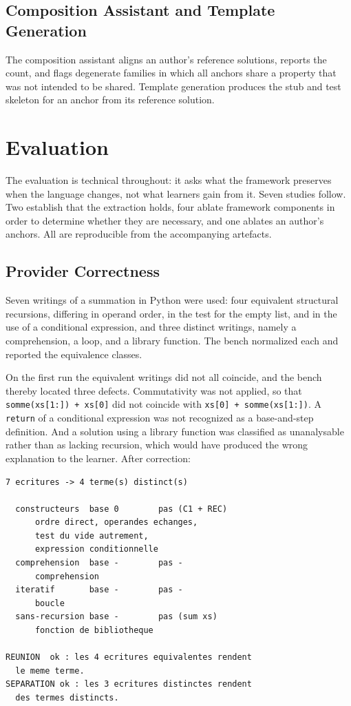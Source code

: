 \documentclass[journal]{IEEEtran}
\begin{document}
\subsection{Composition Assistant and Template Generation}\label{sec:7.3}
The composition assistant aligns an author's reference solutions,
reports the count, and flags degenerate families in which all anchors
share a property that was not intended to be shared. Template generation
produces the stub and test skeleton for an anchor from its reference
solution.

\section{Evaluation}\label{sec:8}
The evaluation is technical throughout: it asks what the framework
preserves when the language changes, not what learners gain from it.
Seven studies follow. Two establish that the extraction holds, four ablate
framework components in order to determine whether they are necessary, and
one ablates an author's anchors.
All are reproducible from the accompanying artefacts.

\subsection{Provider Correctness}\label{sec:8.1}
Seven writings of a summation in Python were used: four equivalent
structural recursions, differing in operand order, in the test for the
empty list, and in the use of a conditional expression, and three
distinct writings, namely a comprehension, a loop, and a library
function. The bench normalized each and reported the equivalence
classes.

On the first run the equivalent writings did not all coincide, and the
bench thereby located three defects. Commutativity was not applied, so that
\texttt{somme(xs[1:]) + xs[0]} did not coincide with
\texttt{xs[0] + somme(xs[1:])}. A \texttt{return} of a
conditional expression was not recognized as a base-and-step definition.
And a solution using a library function was classified as unanalysable
rather than as lacking recursion, which would have produced the wrong
explanation to the learner. After correction:
\begin{samepage}\noindent\begin{minipage}{\linewidth}
\begin{verbatim}
7 ecritures -> 4 terme(s) distinct(s)

  constructeurs  base 0        pas (C1 + REC)
      ordre direct, operandes echanges,
      test du vide autrement,
      expression conditionnelle
  comprehension  base -        pas -
      comprehension
  iteratif       base -        pas -
      boucle
  sans-recursion base -        pas (sum xs)
      fonction de bibliotheque

REUNION  ok : les 4 ecritures equivalentes rendent
  le meme terme.
SEPARATION ok : les 3 ecritures distinctes rendent
  des termes distincts.
\end{verbatim}
\end{minipage}\end{samepage}
\end{document}
